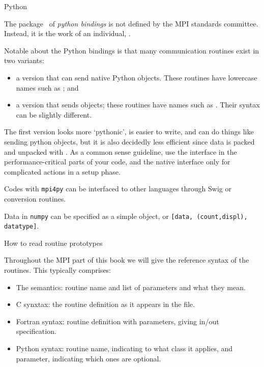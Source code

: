 

 {Python}
\label{sec:python-bind}

The  package~\cite{mpi4py:homepage} of \emph{python bindings}
is not defined by the MPI
standards committee. Instead, it is the work of an individual,
.

Notable about the Python bindings is that many communication routines
exist in two variants:
\begin{itemize}
\item a version that can send native Python objects. These routines
  have lowercase names such as ; and
\item a version that sends  objects; these routines
  have names such as . Their syntax can be slightly different.
\end{itemize}
The first version looks more `pythonic', is easier to write,
and can do things like sending python objects,
but it is also decidedly less efficient since data is packed
and unpacked with . As a common sense guideline,
use the  interface in the performance-critical parts
of your code, and the native interface only for complicated
actions in a setup phase.

Codes with \texttt{mpi4py} can be interfaced to other languages
through Swig or conversion routines.

Data in \texttt{numpy} can be specified as a simple object,
or \texttt{[data, (count,displ), datatype]}.


 {How to read routine prototypes}
\label{sec:protos}

Throughout the MPI part of this book we will give the reference syntax
of the routines. This typically comprises:
\begin{itemize}
\item The semantics: routine name and list of parameters and what they
  mean.
\item C synxtax: the routine definition as it appears in the
   file.
\item Fortran syntax: routine definition with parameters, giving
  in/out specification.
\item Python syntax: routine name, indicating to what class it
  applies, and parameter, indicating which ones are optional.
\end{itemize}

